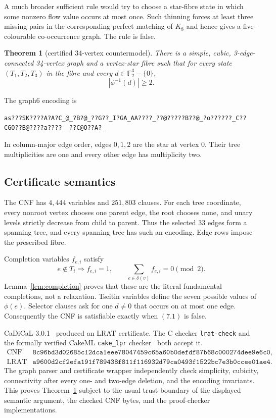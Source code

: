 \documentclass[11pt]{article}
\newtheorem{theorem}{Theorem}[section]
\theoremstyle{definition}
\theoremstyle{remark}
\newcommand{\F}{\mathbb F}
\newcommand{\1}{\mathbf 1}
\begin{document}
A much broader sufficient rule would try to choose a star-fibre state in
which some nonzero flow value occurs at most once.  Such thinning forces at
least three missing pairs in the corresponding perfect matching of \(K_8\)
and hence gives a five-colourable co-occurrence graph.  The rule is false.

\begin{theorem}[certified 34-vertex countermodel]\label{thm:thin}
There is a simple, cubic, 3-edge-connected 34-vertex graph and a
vertex-star fibre such that for every state
\((T_1,T_2,T_3)\) in the fibre and every \(d\in\F_2^3-\{0\}\),
\[
 |\phi^{-1}(d)|\geq2.                                    \tag{7.1}
\]
\end{theorem}

The graph6 encoding is
\begin{center}
\footnotesize
\nolinkurl{as???SK????A?A?C_@_?B?@_??G??_I?GA_AA????_??@?????B??@_?o??????_C??CGO??B@????a????__??C@O??A?_}
\end{center}
In column-major edge order, edges \(0,1,2\) are the star at vertex \(0\).
Their tree multiplicities are one and every other edge has multiplicity
two.

\subsection{Certificate semantics}

The CNF has \(4{,}444\) variables and \(251{,}803\) clauses.  For each
tree coordinate, every nonroot vertex chooses one parent edge, the root
chooses none, and unary levels strictly decrease from child to parent.
Thus the selected \(33\) edges form a spanning tree, and every spanning
tree has such an encoding.  Edge rows impose the prescribed fibre.

Completion variables \(f_{e,i}\) satisfy
\[
 e\notin T_i\Longrightarrow f_{e,i}=1,\qquad
 \sum_{e\in\delta(v)}f_{e,i}=0\pmod2.                     \tag{7.2}
\]
Lemma~\ref{lem:completion} proves that these are the literal fundamental
completions, not a relaxation.  Tseitin variables define the seven possible
values of \(\phi(e)\).  Selector clauses ask for one \(d\ne0\) that occurs
on at most one edge.  Consequently the CNF is satisfiable exactly when
\((7.1)\) is false.

CaDiCaL 3.0.1~\cite{PollittEtAl2026} produced an LRAT certificate.
The C checker \texttt{lrat-check} and the formally verified CakeML
\texttt{cake\_lpr} checker~\cite{TanHeuleMyreen2021} both accept it.
\[
\begin{array}{ll}
\text{CNF SHA-256}&
\texttt{8c96bd3d02685c12dca1eee78047459c65a60b0defdf87b68c000274dee9e6c0},\\
\text{LRAT SHA-256}&
\texttt{a9600d2cf2efa191f789438f811f116932d79ca0493f1522bc7e3b0ccee01ae4}.
\end{array}
\]
The graph parser and certificate wrapper independently check simplicity,
cubicity, connectivity after every one- and two-edge deletion, and the
encoding invariants.  This proves Theorem~\ref{thm:thin} subject to the
usual trust boundary of the displayed semantic argument, the checked CNF
bytes, and the proof-checker implementations.
\end{document}
